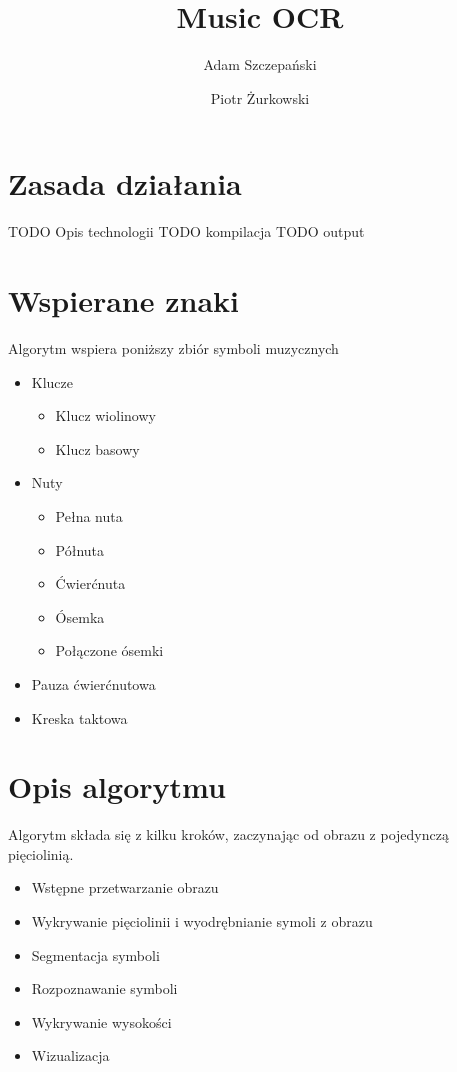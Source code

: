 \documentclass[a4paper,11pt]{article}
\title{Music OCR}
\author{
	Adam Szczepański
	\and
	Piotr Żurkowski
}
\begin{document}
\maketitle

\section{Zasada działania}

TODO Opis technologii
TODO kompilacja
TODO output

\section{Wspierane znaki}

Algorytm wspiera poniższy zbiór symboli muzycznych
\begin{itemize}
\item Klucze
  \begin{itemize}
  \item Klucz wiolinowy
  \item Klucz basowy
  \end{itemize}
\item Nuty
  \begin{itemize}
  \item Pełna nuta
  \item Półnuta
  \item Ćwierćnuta
  \item Ósemka
  \item Połączone ósemki
  \end{itemize}
\item Pauza ćwierćnutowa
\item Kreska taktowa
\end{itemize}

\section{Opis algorytmu}

Algorytm składa się z kilku kroków, zaczynając od obrazu z pojedynczą pięciolinią.
\begin{itemize}
\item Wstępne przetwarzanie obrazu
\item Wykrywanie pięciolinii i wyodrębnianie symoli z obrazu
\item Segmentacja symboli
\item Rozpoznawanie symboli
\item Wykrywanie wysokości
\item Wizualizacja
\end{itemize}
\end{document}
